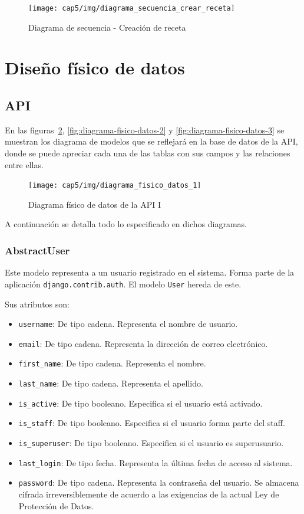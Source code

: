 \begin{figure}[htbp]
  \centering
  \texttt{[image: cap5/img/diagrama\_secuencia\_crear\_receta]}
  \caption{Diagrama de secuencia - Creación de receta}
  \label{fig:diagrama-secuencia-crear-receta}
\end{figure}


\section{Diseño físico de datos}
\label{sec:diseno-fisico-datos}

\subsection{API}

En las figuras~\ref{fig:diagrama-fisico-datos-1},
\ref{fig:diagrama-fisico-datos-2} y \ref{fig:diagrama-fisico-datos-3} se
muestran los diagrama de modelos que se reflejará en la base de datos de la API,
donde se puede apreciar cada una de las tablas con sus campos y las relaciones
entre ellas.


\begin{figure}[htbp]
  \centering
  \texttt{[image: cap5/img/diagrama\_fisico\_datos\_1]}
  \caption{Diagrama físico de datos de la API I}
  \label{fig:diagrama-fisico-datos-1}
\end{figure}


A continuación se detalla todo lo especificado en dichos diagramas.

\subsubsection{AbstractUser}

Este modelo representa a un usuario registrado en el sistema. Forma parte de la
aplicación \texttt{django.contrib.auth}. El modelo \texttt{User} hereda de este.

Sus atributos son:
\begin{itemize}
\item \texttt{username}: De tipo cadena. Representa el nombre de usuario.
\item \texttt{email}: De tipo cadena. Representa la dirección de correo
  electrónico.
\item \texttt{first\_name}: De tipo cadena. Representa el nombre.
\item \texttt{last\_name}: De tipo cadena. Representa el apellido.
\item \texttt{is\_active}: De tipo booleano. Especifica si el usuario está
  activado.
\item \texttt{is\_staff}: De tipo booleano. Especifica si el usuario forma parte
  del staff.
\item \texttt{is\_superuser}: De tipo booleano. Especifica si el usuario es
  superusuario.
\item \texttt{last\_login}: De tipo fecha. Representa la última fecha de acceso
  al sistema.
\item \texttt{password}: De tipo cadena. Representa la contraseña del usuario.
  Se almacena cifrada irreversiblemente de acuerdo a las exigencias de la actual
  Ley de Protección de Datos.
\end{itemize}


